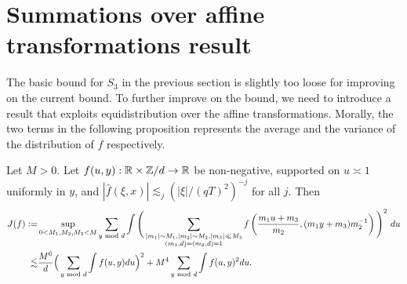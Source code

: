 \section{Summations over affine transformations result}
The basic bound for $S_3$ in the previous section is slightly too loose for improving on the current bound. To further improve on the bound, we need to introduce a result that exploits equidistribution over the affine transformations. Morally, the two terms in the following proposition represents the average and the variance of the distribution of $f$ respectively.

\iffalse
\begin{proposition}[Refinement of $S_3$]
    \label{refinements_3}
    We have \[
    S_3\lesssim \phi(q)^{7/2}T^2|\mathcal{S}|^{3/2}+\phi(q)^{3}\frac{NT}{q}|\mathcal{S}|^{1/2}E(\mathcal{S})^{1/2}.
     \]
\end{proposition}
The refinement of the previous bound relies on the result for summation over affine transformation by Guth and Maynard.
\begin{lemma} \label{affineGM}
    Let $M>0$. Let $f(u)\geq 0$, supported on $u\asymp 1$, and $|\hat{f}(\xi)|\lesssim_j ((1+|\xi|)/T)^{-j}$ for all $j\in \mathbb{N}$. Then \[
        \sup_{0<M_1,M_2,M_3<M} \int\Bigg( \sum_{\substack{|m_1|\sim M_1\\|m_2|\sim M_2 \\ |m_3|\ll M_3}} f\left(\frac{m_1 u+m_3}{m_2}\right)\Bigg)^2 \ du \lesssim M^6 \|f\|_{L_1}^2+M^4\|f\|_{L_2}^2.
    \] 
\end{lemma}
This is Proposition 9.1 from [GM]. The reduction in \[
\sum_{\substack{y_1,y_2 \in\mathbb{Z}/q\mathbb{Z} }}\int_{v_1\asymp 1}\Big[\sum_{\substack{|m_1|\sim M_1,|m_2|,|m_3|\sim M\\ y_1m_1+y_2m_2+m_3\equiv 0 \mod q_0}}\Big|\tilde{R}_M\left(\frac{m_1v_1+m_3}{-m_2v_1},y_2,y_1\right)\Big|^2\Big]^2dv_1\]
is somewhat lossy, so we aim to refine this bound in this section.
In principle, the condition $y_1m_1+y_2m_2+m_3\equiv 0$ fixes the residue class of $m_3$ based on $m_1$ and $m_2$. Therefore, we would expect a factor of $1/q^2$ if we add this summation condition to Proposition \ref{affineGM}. 
\fi
\begin{proposition}\label{affinetrans}
    Let $M>0$. Let $f(u,y):\mathbb{R}\times \mathbb{Z}/d \to \mathbb{R}$ be non-negative, supported on $u\asymp 1$ uniformly in $y$, and $|\hat{f}(\xi,x)|\lesssim_j (|\xi|/(qT)^2)^{-j}$ for all $j$. Then \begin{align*}
        J(f)\mathrel{\mathop:}= &\sup_{0<M_1,M_2,M_3<M}\sum_{y \textrm{ mod } d} \int\Bigg( \sum_{\substack{|m_1|\sim M_1,|m_2|\sim M_2 , |m_3|\ll M_3\\ (m_1,d)=(m_2,d)=1}} f\left(\frac{m_1 u+m_3}{m_2},(m_1 y+m_3)m_2^{-1}\right)\Bigg)^2 \ du\\
        \lesssim&\frac{M^6}{d}\Big(\sum_{y \textrm{ mod } d } \int f(u,y) du\Big)^2+{M^4}\sum_{y\textrm{ mod } d} \int f(u,y)^2 du.
    \end{align*}
\end{proposition}

